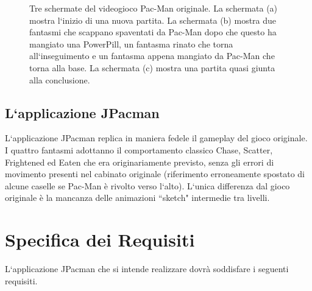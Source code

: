 \documentclass[12pt,a4paper]{report}
\begin{document}
\begin{figure}[hb!]
\begin{subfigure}{.32\textwidth}
  \caption{}
  \label{fig:snap3}
\end{subfigure}
\caption{Tre schermate del videogioco Pac-Man originale. La schermata (a) mostra l`inizio di una nuova partita. La schermata (b) mostra due fantasmi che scappano spaventati da Pac-Man dopo che questo ha mangiato una PowerPill, un fantasma rinato che torna all`inseguimento e un fantasma appena mangiato da Pac-Man che torna alla base. La schermata (c) mostra una partita quasi giunta alla conclusione.}
\label{fig:fig}
\end{figure}





\section{L`applicazione JPacman}\label{se:appjgal}
L`applicazione JPacman replica in maniera fedele il gameplay del gioco originale.
I quattro fantasmi adottanno il comportamento classico Chase, Scatter, Frightened ed Eaten che era originariamente previsto, senza gli errori di movimento presenti nel cabinato originale (riferimento erroneamente spostato di alcune caselle se Pac-Man è rivolto verso l`alto). L`unica differenza dal gioco originale è la mancanza delle animazioni ``sketch" intermedie tra livelli.



\chapter{Specifica dei Requisiti}\label{ch:spereq}

L`applicazione JPacman che si intende realizzare dovrà soddisfare i seguenti requisiti.
\end{document}

